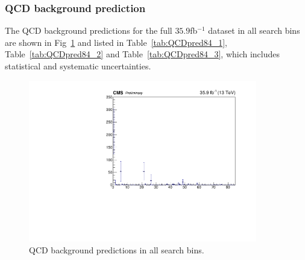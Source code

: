 \subsubsection{QCD background prediction}
The QCD background predictions for the full $35.9$fb$^{-1}$ dataset in all search bins are shown in Fig~\ref{fig:SBPrediction} and listed in Table~\ref{tab:QCDpred84_1}, Table~\ref{tab:QCDpred84_2} and Table~\ref{tab:QCDpred84_3}, which includes statistical and systematic uncertainties.
\begin{figure}[htbp]
\begin{center}
\includegraphics[width=0.89\textwidth]{sections/mc4/Backgrounds/QCD/figures/84sb/_sb_Data.pdf}
\end{center}\caption{QCD background predictions in all search bins.}
\label{fig:SBPrediction}
\end{figure}

